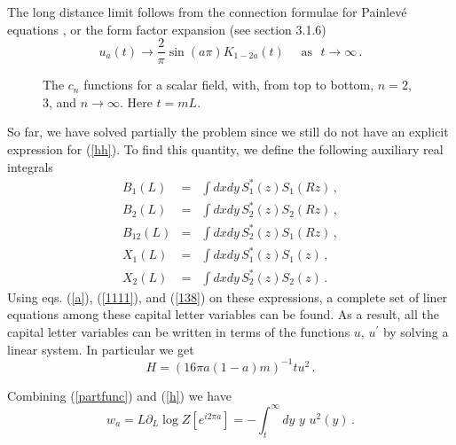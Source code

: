 \documentclass[a4paper]{article}
\begin{document}
The long distance limit follows from the connection formulae for Painlev\'e equations \cite{rims}, or the form factor expansion (see section 3.1.6)
\begin{equation}
u_{a}(t)\rightarrow \frac{2}{\pi} \sin (a \pi) K_{1-2 a} (t)\,\,\,\,\,\,\,\, \textrm{as} \,\,\,\, t\rightarrow \infty \label{infinito}\,.
\end{equation}

\begin{figure} [tbp]
\centering
\leavevmode
\epsfxsize=8cm
\bigskip
{}
\caption{The $c_n$ functions for a scalar field, with, from top to bottom, $n=2$, $3$, and $n\rightarrow \infty$. Here $t=m L$.} \label{fii}
\end{figure}



So far, we have solved partially the problem since we still do not have an explicit expression for (\ref{hh}).
To find this quantity, we define the following auxiliary real integrals 
\begin{eqnarray}
B_{1}(L) &=&\int dxdy\,S_{1}^{*}(z)S_{1}(Rz)\,, \\
B_{2}(L) &=&\int dxdy\,S_{2}^{*}(z)S_{2}(Rz) \,,\\
B_{12}(L) &=&\int dxdy\,S_{2}^{*}(z)S_{1}(Rz) \,,\\
X_{1}(L) &=&\int dxdy\,S_{1}^{*}(z)S_{1}(z) \,,\label{x1}\\
X_{2}(L) &=&\int dxdy\,S_{2}^{*}(z)S_{2}(z)\,.\label{x2}
\end{eqnarray}
Using eqs. (\ref{a}), (\ref{1111}), and (\ref{138}) on these expressions, a complete set of liner equations among these capital letter variables can be found. 
 As a result, all the capital letter 
variables can be written in terms of the functions $u$, $u^\prime$ by solving a linear system. In particular we get
\begin{equation}
H=\left(16 \pi a \left( 1-a \right) m\right)^{-1} tu^{2}\,.\label{h}
\end{equation}

Combining (\ref{partfunc}) and (\ref{h}) we have 
\begin{equation}
w_a=L\partial_L\log Z[e^{i 2\pi a}] =-\int_{t}^{\infty}dy\,\,y\,\,u^{2}(y)\,. \label{kuu}
\end{equation}
\end{document}
